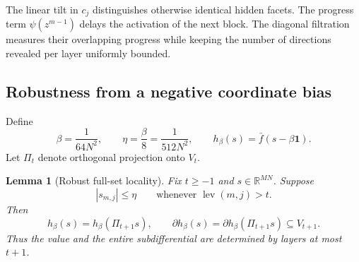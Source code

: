 \documentclass[11pt,a4paper]{article}
\newcommand{\R}{\mathbb{R}}
\newcommand{\one}{\mathbf 1}
\newcommand{\abs}[1]{\left\lvert #1\right\rvert}
\DeclareMathOperator{\lev}{lev}
\newtheorem{lemma}[theorem]{Lemma}
\theoremstyle{definition}
\numberwithin{equation}{section}
\begin{document}
The linear tilt in $c_j$ distinguishes otherwise identical hidden facets.
The progress term $\psi(z^{m-1})$ delays the activation of the next block.
The diagonal filtration measures their overlapping progress while keeping
the number of directions revealed per layer uniformly bounded.

\subsection{Robustness from a negative coordinate bias}\label{sec:robust}

Define
\begin{equation}\label{eq:betaeta}
 \beta=\frac1{64N^2},
 \qquad
 \eta=\frac\beta8=\frac1{512N^2},
 \qquad
 h_\beta(s)=\bar f(s-\beta\one).
\end{equation}
Let $\Pi_t$ denote orthogonal projection onto $V_t$.

\begin{lemma}[Robust full-set locality]\label{lem:robust}
Fix $t\ge-1$ and $s\in\R^{MN}$.  Suppose
\[
 \abs{s_{m,j}}\le\eta
 \qquad\text{whenever }\lev(m,j)>t.
\]
Then
\begin{equation}\label{eq:locality}
 h_\beta(s)=h_\beta(\Pi_{t+1}s),
 \qquad
 \partial h_\beta(s)=\partial h_\beta(\Pi_{t+1}s)
 \subseteq V_{t+1}.
\end{equation}
Thus the value and the entire subdifferential are determined by layers at most $t+1$.
\end{lemma}
\end{document}
